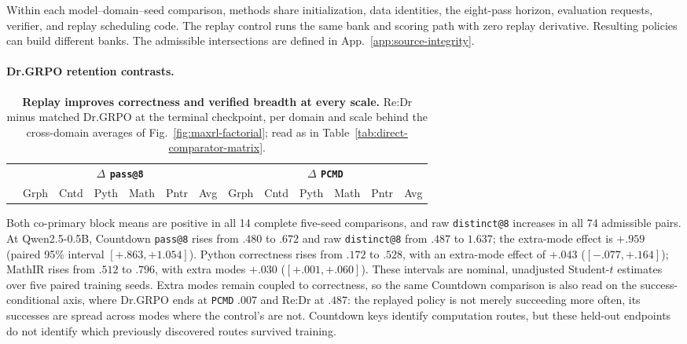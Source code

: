 \documentclass{article}
\newcommand{\1}{\mathbf 1}
\newcommand{\pmd}{\texttt{PCMD}}
\theoremstyle{remark}
\theoremstyle{definition}
\theoremstyle{plain}
\begin{document}
Within each model--domain--seed comparison, methods share initialization,
data identities, the eight-pass horizon, evaluation requests, verifier, and
replay scheduling code. The replay control runs the same bank and scoring
path with zero replay derivative. Resulting policies can build different
banks. The admissible intersections are defined in
App.~\ref{app:source-integrity}.

\crossscaletablematerial

\paragraph{Dr.GRPO retention contrasts.}
\label{app:retention-numerical-detail}

\begin{table}[H]
  \centering
  \caption{\textbf{Replay improves correctness and verified breadth at every
  scale.} Re:Dr minus matched Dr.GRPO at the terminal checkpoint, per domain
  and scale behind the cross-domain averages of
  Fig.~\ref{fig:maxrl-factorial}; read as in
  Table~\ref{tab:direct-comparator-matrix}.}
  \label{tab:cross-scale-terminal-effects}
  \scriptsize
  \setlength{\tabcolsep}{2.3pt}
  \renewcommand{\arraystretch}{0.92}
  \begin{tabular}{@{}l*{12}{r}@{}}
    \toprule
    & \multicolumn{6}{c}{\textbf{$\Delta$ \texttt{pass@8}}}
      & \multicolumn{6}{c}{\textbf{$\Delta$ \pmd{}}} \\
    \cmidrule(lr){2-7}\cmidrule(l){8-13}
    & Grph & Cntd & Pyth & Math & Pntr & Avg
      & Grph & Cntd & Pyth & Math & Pntr & Avg \\
    \midrule
    
  \end{tabular}
\end{table}

Both co-primary block means are positive in all 14 complete five-seed
comparisons, and raw \texttt{distinct@8} increases in all 74 admissible pairs.
At Qwen2.5-0.5B, Countdown \texttt{pass@8} rises from $.480$ to $.672$ and
raw \texttt{distinct@8} from $.487$ to $1.637$; the extra-mode effect is
$+.959$ (paired 95\% interval $[+.863,+1.054]$). Python correctness rises
from $.172$ to $.528$, with an extra-mode effect of $+.043$
($[-.077,+.164]$); MathIR rises from $.512$ to $.796$, with extra modes
$+.030$ ($[+.001,+.060]$). These intervals are nominal, unadjusted
Student-$t$ estimates over five paired training seeds. Extra modes remain
coupled to correctness, so the same Countdown comparison is also read on the
success-conditional axis, where Dr.GRPO ends at \pmd{} $.007$ and
Re:Dr at $.487$: the replayed policy is not merely succeeding more
often, its successes are spread across modes where the control's are not. Countdown keys identify computation routes, but
these held-out endpoints do not identify which previously discovered
routes survived training.
\end{document}
